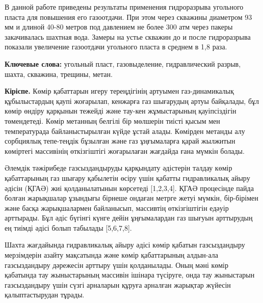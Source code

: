 В данной работе приведены результаты применения гидроразрыва угольного
пласта для повышения его газоотдачи. При этом через скважины диаметром
93 мм и длиной 40-80 метров под давлением не более 300 атм через пакеры
закачивалась шахтная вода. Замеры на устье скважин до и после
гидроразрыва показали увеличение газоотдачи угольного пласта в среднем в
1,8 раза.

{\bfseries Ключевые слова:} угольный пласт, газовыделение, гидравлический
разрыв, шахта, скважина, трещины, метан.

\begin{multicols}{2}
{\bfseries Кіріспе.} Көмір қабаттарын игеру тереңдігінің артуымен
газ-динамикалық құбылыстардың қаупі жоғарылап, кенжарға газ шығарудың
артуы байқалады, бұл көмір өндіру қарқынын тежейді және тау-кен
жұмыстарының қауіпсіздігін төмендетеді. Көмір метанның белгілі бір
мөлшерін тиісті қысым мен температурада байланыстырылған күйде ұстай
алады. Көмірден метанды алу сорбциялық тепе-теңдік бұзылған және газ
ұңғымаларға қарай жылжитын көміртегі массивінің өткізгіштігі жоғарылаған
жағдайда ғана мүмкін болады.

Әлемдік тәжірибеде газсыздандыруды қарқындату әдістерін талдау көмір
қабаттарының газ шығару қабылетін өсіру үшін қабатты гидравликалық айыру
әдісін (ҚГАӘ) жиі қолданылатынын көрсетеді {[}1,2,3,4{]}. ҚГАӘ
процесінде пайда болған жарықшалар ұзындығы бірнеше ондаған метрге жетуі
мүмкін, бір-бірімен және басқа жарықшалармен байланысып, массивтің
өткізгіштігін едәуір арттырады. Бұл әдіс бүгінгі күнге дейін
ұңғымалардан газ шығуын арттырудың ең тиімді әдісі болып табылады
{[}5,6,7,8{]}.

Шахта жағдайында гидравликалық айыру әдісі көмір қабатын газсыздандыру
мерзімдерін азайту мақсатында және көмір қабаттарының алдын-ала
газсыздандыру дәрежесін арттыру үшін қолданылады. Оның мәні көмір
қабатында тау жыныстарының массивін ішінара түсіруге, онда тау
жыныстарын газсыздандыру үшін сүзгі арналарын құруға арналған жарықтар
жүйесін қалыптастырудан тұрады.


\end{multicols}
